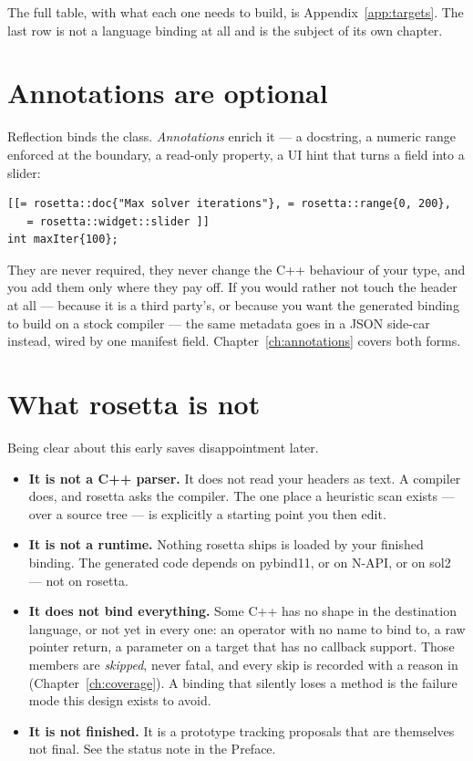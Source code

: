 The full table, with what each one needs to build, is
Appendix~\ref{app:targets}. The last row is not a language binding at all and
is the subject of its own chapter.

\section{Annotations are optional}

Reflection binds the class. \emph{Annotations} enrich it --- a docstring, a
numeric range enforced at the boundary, a read-only property, a UI hint that
turns a field into a slider:

\begin{lstlisting}[style=cpp]
[[= rosetta::doc{"Max solver iterations"}, = rosetta::range{0, 200},
   = rosetta::widget::slider ]]
int maxIter{100};
\end{lstlisting}

They are never required, they never change the C++ behaviour of your type, and
you add them only where they pay off. If you would rather not touch the header
at all --- because it is a third party's, or because you want the generated
binding to build on a stock compiler --- the same metadata goes in a JSON
side-car instead, wired by one manifest field. Chapter~\ref{ch:annotations}
covers both forms.

\section{What rosetta is not}

Being clear about this early saves disappointment later.

\begin{itemize}
  \item \textbf{It is not a C++ parser.} It does not read your headers as text.
    A compiler does, and rosetta asks the compiler. The one place a heuristic
    scan exists ---  over a source tree --- is
    explicitly a starting point you then edit.
  \item \textbf{It is not a runtime.} Nothing rosetta ships is loaded by your
    finished binding. The generated code depends on pybind11, or on N-API, or
    on sol2 --- not on rosetta.
  \item \textbf{It does not bind everything.} Some C++ has no shape in the
    destination language, or not yet in every one: an operator with no name
    to bind to, a raw pointer return, a  parameter on a
    target that has no callback support. Those members are
    \emph{skipped}, never fatal, and every skip is recorded with a reason in
     (Chapter~\ref{ch:coverage}). A binding that silently
    loses a method is the failure mode this design exists to avoid.
  \item \textbf{It is not finished.} It is a prototype tracking proposals that
    are themselves not final. See the status note in the Preface.
\end{itemize}

